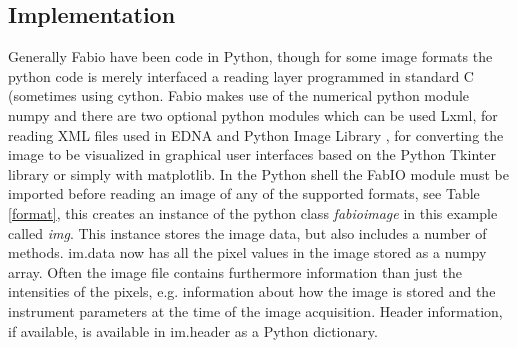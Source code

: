 \documentclass{iucr}
\begin{document}
\subsection{Implementation}

Generally Fabio have been code in Python\cite{python},
though for some image formats the python code is merely interfaced a reading 
layer programmed in standard C (sometimes using cython\cite{cython}.
Fabio makes use of the numerical python module numpy\cite{numpy} and there are
two optional python modules which can be used Lxml, for reading XML files
used in EDNA\cite{edna} and Python Image Library
\cite{pil}, for converting the image to be visualized in graphical user
interfaces based on the Python Tkinter library\cite{???} or simply with matplotlib\cite{matplotlib}. 
In the Python shell the FabIO module must be imported before reading an image of any of the supported formats, see Table \ref{format},  
this creates an instance of the python class {\em fabioimage} in this example called {\em img}.
This instance stores the image data, but also includes a number of methods.
im.data now has all the pixel values in the image stored as a numpy array. 
Often the image file contains furthermore information than just the intensities of the pixels, 
e.g. information about how the image is stored and the instrument parameters at the time of the image acquisition.
Header information, if available, is available in im.header as a Python dictionary.
 
\end{document}
